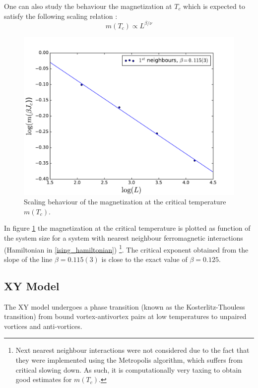 \documentclass[twoside]{article}
\begin{document}
\begin{multicols}{2}
One can also study the behaviour the magnetization at $T_c$ which is expected to satisfy the following scaling relation \cite{tang}:
\begin{equation}
m(T_c) \propto L^{\beta/\nu}
\end{equation}

\begin{figure}[H]
\centering
\includegraphics[scale=0.4]{images/plot_magnetization.pdf}
\caption{Scaling behaviour of the magnetization at the critical temperature $m(T_c)$.}
\label{scaling_magnetization}
\end{figure}

In figure \ref{scaling_magnetization} the magnetization at the critical temperature is plotted as function of the system size for a system with nearest neighbour ferromagnetic interactions (Hamiltonian in \eqref{ising_hamiltonian}) \footnote{Next nearest neighbour interactions were not considered due to the fact that they were implemented using the Metropolis algorithm, which suffers from critical slowing down. As such, it is computationally very taxing to obtain good estimates for $m(T_c)$.}. The critical exponent obtained from the slope of the line $\beta = 0.115(3)$ is close to the exact value of $\beta = 0.125$.

\subsection{XY Model}
The XY model undergoes a phase transition (known as the Kosterlitz-Thouless transition) from bound vortex-antivortex pairs at low temperatures to unpaired vortices and anti-vortices. 


\end{multicols}
\end{document}
